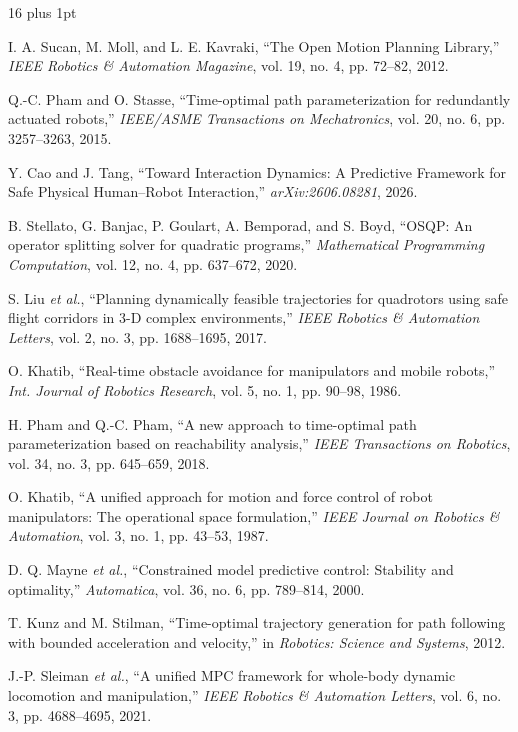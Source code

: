 \begin{thebibliography}{16}
\itemsep=-1.5pt plus 1pt

I. A. Sucan, M. Moll, and L. E. Kavraki, ``The Open Motion Planning Library,'' \emph{IEEE Robotics \& Automation Magazine}, vol. 19, no. 4, pp. 72--82, 2012.

Q.-C. Pham and O. Stasse, ``Time-optimal path parameterization for redundantly actuated robots,'' \emph{IEEE/ASME Transactions on Mechatronics}, vol. 20, no. 6, pp. 3257--3263, 2015.

Y. Cao and J. Tang, ``Toward Interaction Dynamics: A Predictive Framework for Safe Physical Human--Robot Interaction,'' \emph{arXiv:2606.08281}, 2026.

B. Stellato, G. Banjac, P. Goulart, A. Bemporad, and S. Boyd, ``OSQP: An operator splitting solver for quadratic programs,'' \emph{Mathematical Programming Computation}, vol. 12, no. 4, pp. 637--672, 2020.

S. Liu \emph{et al.}, ``Planning dynamically feasible trajectories for quadrotors using safe flight corridors in 3-D complex environments,'' \emph{IEEE Robotics \& Automation Letters}, vol. 2, no. 3, pp. 1688--1695, 2017.

O. Khatib, ``Real-time obstacle avoidance for manipulators and mobile robots,'' \emph{Int. Journal of Robotics Research}, vol. 5, no. 1, pp. 90--98, 1986.

H. Pham and Q.-C. Pham, ``A new approach to time-optimal path parameterization based on reachability analysis,'' \emph{IEEE Transactions on Robotics}, vol. 34, no. 3, pp. 645--659, 2018.

O. Khatib, ``A unified approach for motion and force control of robot manipulators: The operational space formulation,'' \emph{IEEE Journal on Robotics \& Automation}, vol. 3, no. 1, pp. 43--53, 1987.

D. Q. Mayne \emph{et al.}, ``Constrained model predictive control: Stability and optimality,'' \emph{Automatica}, vol. 36, no. 6, pp. 789--814, 2000.

T. Kunz and M. Stilman, ``Time-optimal trajectory generation for path following with bounded acceleration and velocity,'' in \emph{Robotics: Science and Systems}, 2012.

J.-P. Sleiman \emph{et al.}, ``A unified MPC framework for whole-body dynamic locomotion and manipulation,'' \emph{IEEE Robotics \& Automation Letters}, vol. 6, no. 3, pp. 4688--4695, 2021.


\end{thebibliography}
